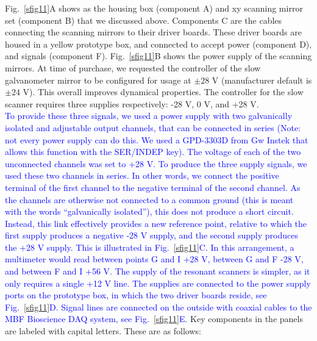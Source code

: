 \documentclass[10pt,letterpaper]{article}
\begin{document}
%
Fig.~\ref{sfig11}A shows as the housing box (component A) and xy scanning mirror set (component B) that we discussed above. Components C are the cables connecting the scanning mirrors to their driver boards. These driver boards are housed in a yellow prototype box, and connected to accept power (component D), and signals (component F). Fig.~\ref{sfig11}B shows the power supply of the scanning mirrors. At time of purchase, we requested the controller of the slow galvanometer mirror to be configured for usage at $\pm 28\text{ V}$ (manufacturer default is $\pm 24\text{ V}$). This overall improves dynamical properties. The controller for the slow scanner requires three supplies respectively: -28 V, 0 V, and +28 V. \\
\textcolor{blue}{To provide these three signals, we used a power supply with two galvanically isolated and adjustable output channels, that can be connected in series (Note: not every power supply can do this. We used a GPD-3303D from Gw Instek that allows this function with the SER/INDEP key). The voltage of each of the two unconnected channels was set to +28 V. To produce the three supply signals, we used these two channels in series. In other words, we connect the positive terminal of the first channel to the negative terminal of the second channel. As the channels are otherwise not connected to a common ground (this is meant with the words ``galvanically isolated''), this does not produce a short circuit. Instead, this link effectively provides a new reference point, relative to which the first supply produces a negative -28 V supply, and the second supply produces the +28 V supply. This is illustrated in Fig.~\ref{sfig11}C. In this arrangement, a multimeter would read between points G and I +28 V, between G and F -28 V, and between F and I +56 V. The supply of the resonant scanners is simpler, as it only requires a single +12 V line. The supplies are connected to the power supply ports on the prototype box, in which the two driver boards reside, see Fig.~\ref{sfig11}D. Signal lines are connected on the outside with coaxial cables to the MBF Bioscience DAQ system, see Fig.~\ref{sfig11}E.} Key components in the panels are labeled with capital letters. These are as follows:
\end{document}
